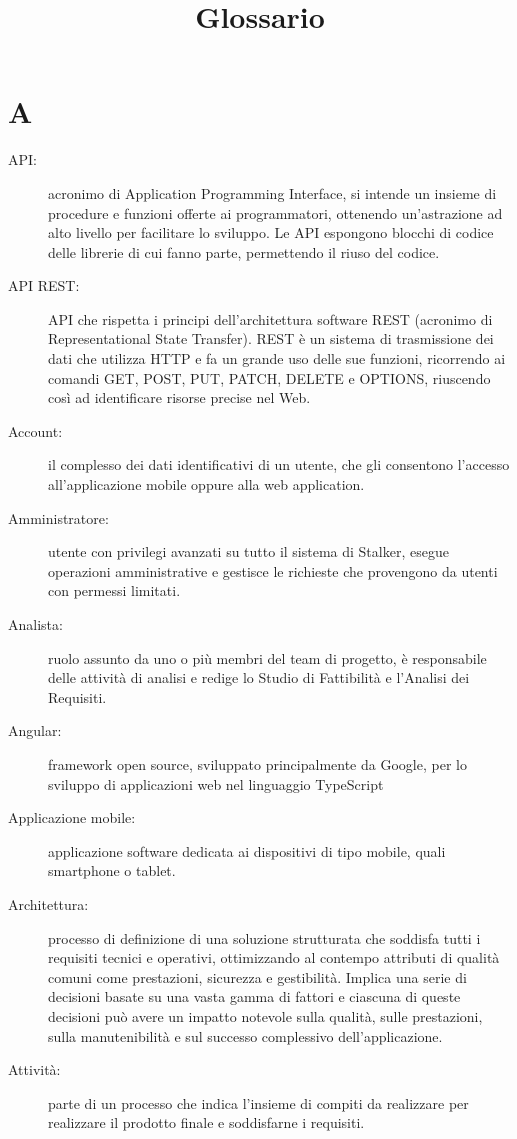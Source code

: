 \documentclass{article}
\title{Glossario}
\begin{document}


	\section{A}
	\begin{description}
		\item[API:] acronimo di Application Programming Interface, si intende un insieme di procedure e funzioni offerte ai programmatori, ottenendo un'astrazione ad alto livello per facilitare lo sviluppo. Le API espongono blocchi di codice delle librerie di cui fanno parte, permettendo il riuso del codice.
		\item[API REST:] API che rispetta i principi dell'architettura software REST (acronimo di Representational State Transfer). REST è un sistema di trasmissione dei dati che utilizza HTTP e fa un grande uso delle sue funzioni, ricorrendo ai comandi GET, POST, PUT, PATCH, DELETE e OPTIONS, riuscendo così ad identificare risorse precise nel Web.
		\item[Account:] il complesso dei dati identificativi di un utente, che gli consentono l'accesso all'applicazione mobile oppure alla web application.
		\item[Amministratore:] utente con privilegi avanzati su tutto il sistema di Stalker, esegue operazioni amministrative e gestisce le richieste che provengono da utenti con permessi limitati.
		\item[Analista:] ruolo assunto da uno o più membri del team di progetto, è responsabile delle attività di analisi e redige lo Studio di Fattibilità e l'Analisi dei Requisiti.
		\item[Angular:] framework open source, sviluppato principalmente da Google, per lo sviluppo di applicazioni web nel linguaggio TypeScript
		\item[Applicazione mobile:] applicazione software dedicata ai dispositivi di tipo mobile, quali smartphone o tablet.
		\item[Architettura:] processo di definizione di una soluzione strutturata che soddisfa tutti i requisiti tecnici e operativi, ottimizzando al contempo attributi di qualità comuni come prestazioni, sicurezza e gestibilità. Implica una serie di decisioni basate su una vasta gamma di fattori e ciascuna di queste decisioni può avere un impatto notevole sulla qualità, sulle prestazioni, sulla manutenibilità e sul successo complessivo dell'applicazione.
		\item[Attività:] parte di un processo che indica l'insieme di compiti da realizzare per realizzare il prodotto finale e soddisfarne i requisiti.
	\end{description}
	\newpage
\end{document}
